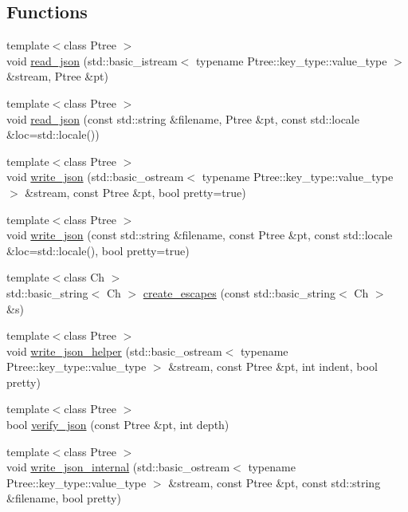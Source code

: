 \subsection*{Functions}
\begin{DoxyCompactItemize}
\item 
{\footnotesize template$<$class Ptree $>$ }\\void \hyperlink{namespaceboost_1_1property__tree_1_1json__parser_a7aed126d35d2893e51c49399ba33c51e}{read\+\_\+json} (std\+::basic\+\_\+istream$<$ typename Ptree\+::key\+\_\+type\+::value\+\_\+type $>$ \&stream, Ptree \&pt)
\item 
{\footnotesize template$<$class Ptree $>$ }\\void \hyperlink{namespaceboost_1_1property__tree_1_1json__parser_aa8344dc0b7987cba89b0630195d7a34d}{read\+\_\+json} (const std\+::string \&filename, Ptree \&pt, const std\+::locale \&loc=std\+::locale())
\item 
{\footnotesize template$<$class Ptree $>$ }\\void \hyperlink{namespaceboost_1_1property__tree_1_1json__parser_ad290247428581132003df8706e3ef9d0}{write\+\_\+json} (std\+::basic\+\_\+ostream$<$ typename Ptree\+::key\+\_\+type\+::value\+\_\+type $>$ \&stream, const Ptree \&pt, bool pretty=true)
\item 
{\footnotesize template$<$class Ptree $>$ }\\void \hyperlink{namespaceboost_1_1property__tree_1_1json__parser_a49f6a7c920e5ac943603a5f10ccf3a32}{write\+\_\+json} (const std\+::string \&filename, const Ptree \&pt, const std\+::locale \&loc=std\+::locale(), bool pretty=true)
\item 
{\footnotesize template$<$class Ch $>$ }\\std\+::basic\+\_\+string$<$ Ch $>$ \hyperlink{namespaceboost_1_1property__tree_1_1json__parser_a747e92e137769eb6b27edb76d613f37a}{create\+\_\+escapes} (const std\+::basic\+\_\+string$<$ Ch $>$ \&s)
\item 
{\footnotesize template$<$class Ptree $>$ }\\void \hyperlink{namespaceboost_1_1property__tree_1_1json__parser_a133973ddea67e6d77424312cd297b332}{write\+\_\+json\+\_\+helper} (std\+::basic\+\_\+ostream$<$ typename Ptree\+::key\+\_\+type\+::value\+\_\+type $>$ \&stream, const Ptree \&pt, int indent, bool pretty)
\item 
{\footnotesize template$<$class Ptree $>$ }\\bool \hyperlink{namespaceboost_1_1property__tree_1_1json__parser_ad1f43753e8e91845fdb1177c1aa0c465}{verify\+\_\+json} (const Ptree \&pt, int depth)
\item 
{\footnotesize template$<$class Ptree $>$ }\\void \hyperlink{namespaceboost_1_1property__tree_1_1json__parser_af1059520397d396ae91e776391a2f32b}{write\+\_\+json\+\_\+internal} (std\+::basic\+\_\+ostream$<$ typename Ptree\+::key\+\_\+type\+::value\+\_\+type $>$ \&stream, const Ptree \&pt, const std\+::string \&filename, bool pretty)
\end{DoxyCompactItemize}


